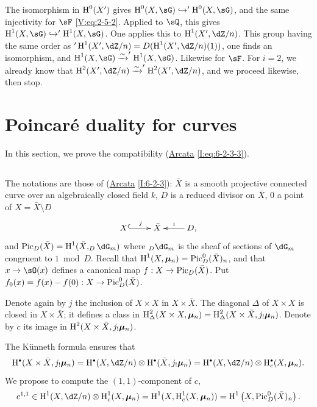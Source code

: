 The isomorphism in $\operatorname{H}^0(X')$ gives $\h^0(X,\sG)\hookrightarrow '\h^0(X,\sG)$,
and the same injectivity for $\sF$ \eqref{V:eq:2-5-2}. Applied to $\sQ$,
this gives $\h^1(X,\sG)\hookrightarrow '\h^1(X,\sG)$. One applies this to
$\h^1(X',\dZ/n)$. This group having the same order as
$'\h^1(X',\dZ/n)=D(\h^1(X',\dZ/n)(1))$, one finds an isomorphism, and
$\h^1(X,\sG) \iso '\h^1(X,\sG)$. Likewise for $\sF$. For $i=2$, we already
know that $\h^2(X',\dZ/n) \iso '\h^2(X',\dZ/n)$, and we proceed likewise,
then stop.










\section{Poincar\'e duality for curves}\label{V:3}

In this section, we prove the compatibility (\hyperref[I]{Arcata}
\ref{I:eq:6-2-3-3}).




\subsection{}\label{V:3-1}

The notations are those of (\hyperref[I]{Arcata} \ref{I:6-2-3}): $\bar X$ is
a smooth projective connected curve over an algebraically closed field $k$,
$D$ is a reduced divisor on $\bar X$, $0$ a point of
$X=\bar X\setminus D$
\[\xymatrix{
  X \ar@{^{(}->}[r]^-j
    & \bar X
    & \ar[l]_-i D \text{,}
}\]
and $\pic_D(\bar X)=\h^1(\bar X,_D\dG_m)$ where $_D\dG_m$ is the sheaf of
sections of $\dG_m$ congruent to $1\bmod D$. Recall that
$\operatorname{H}^1(X,{\bm\mu}_n) = \operatorname{Pic}_D^0(\bar X)_n$, and that $x\to \sO(x)$ defines a
canonical map $f:X\to \operatorname{Pic}_D(\bar X)$. Put
$f_0(x)=f(x)-f(0):X\to \operatorname{Pic}_D^0(\bar X)$.

Denote again by $j$ the inclusion of $X\times X$ in $X\times \bar X$. The
diagonal $\Delta$ of $X\times X$ is closed in $X\times \bar X$; it
defines a class in
$\operatorname{H}_\Delta^2(X\times X,{\bm\mu}_n)=\operatorname{H}_\Delta^2(X\times \bar X,j_!{\bm\mu}_n)$. Denote
by $c$ its image in $\operatorname{H}^2(X\times \bar X,j_!{\bm\mu}_n)$.

The K\"unneth formula ensures that
\[
  \h^\bullet(X\times \bar X,j_!\dmu_n) = \h^\bullet(X,\dZ/n)\otimes \h^\bullet(\bar X,j_!\dmu_n) = \h^\bullet(X,\dZ/n)\otimes \h_c^\bullet(X,\dmu_n) \text{.}
\]
We propose to compute the $(1,1)$-component of $c$,
\[
  c^{1,1} \in \h^1(X,\dZ/n)\otimes \h_c^1(X,\dmu_n) = \h^1(X,\h_c^1(X,\dmu_n)) = \h^1\left(X,\pic_D^0(\bar X)_n\right) \text{.}
\]

